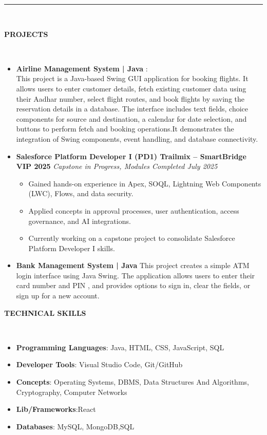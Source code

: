 \documentclass[a4paper,10pt]{article}
\newcommand{\lsep}{-0.5cm}
\newcommand{\resheading}[1]{{\small \colorbox{mygrey}{\begin{minipage}{0.975\textwidth}{\textbf{#1 \vphantom{p\^{E}}}}\end{minipage}}}}
\begin{document}
\indent \rule{6.8in}{0.4pt}
\\

\resheading{\textbf{PROJECTS}} \\[\lsep]
\begin{itemize}
\setlength\itemsep{0.5em}
\item \textbf{Airline Management System | Java }: \\
This project is a Java-based Swing GUI application for booking flights. It allows users to enter customer details, fetch existing customer data using their Aadhar number, select flight routes, and book flights by saving the reservation details in a database. The interface includes text fields, choice components for source and destination, a calendar for date selection, and buttons to perform fetch and booking operations.It demonstrates the integration of Swing components, event handling, and database connectivity.

\item\textbf{Salesforce Platform Developer I (PD1) Trailmix – SmartBridge VIP 2025} \hfill \textit{Capstone in Progress, Modules Completed July 2025}
\begin{itemize}
\setlength\itemsep{0em}
\item Gained hands-on experience in Apex, SOQL, Lightning Web Components (LWC), Flows, and data security.
\item Applied concepts in approval processes, user authentication, access governance, and AI integrations.
\item Currently working on a capstone project to consolidate Salesforce Platform Developer I skills.
\end{itemize}




\item \textbf{Bank Management System | Java}
This project creates a simple ATM login interface using Java Swing. The application allows users to enter their card number and PIN , and provides options to sign in, clear the fields, or sign up for a new account.

\end{itemize}

\resheading{\textbf{TECHNICAL SKILLS}} \\[\lsep]
\begin{itemize}
\setlength\itemsep{0em}
\item \textbf{Programming Languages}: Java, HTML, CSS, JavaScript, SQL
\item \textbf{Developer Tools}: Visual Studio Code, Git/GitHub
\item \textbf{Concepts}: Operating Systems, DBMS, Data Structures And Algorithms, Cryptography, Computer Networks
\item \textbf{Lib/Frameworks}:React
\item \textbf{Databases}: MySQL, MongoDB,SQL
\end{itemize}
\end{document}
